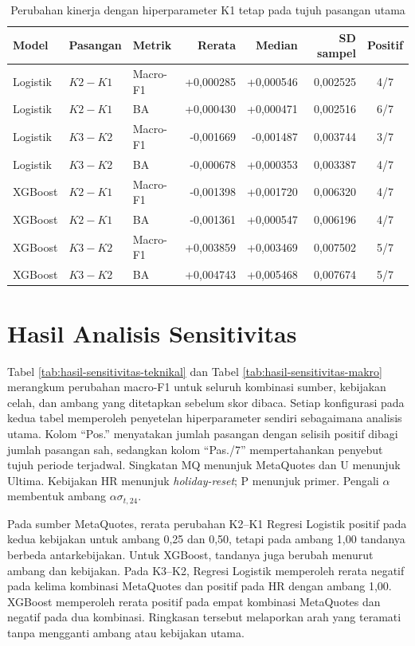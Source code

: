 \begin{table}[htbp]
\centering
\small
\setlength{\tabcolsep}{4pt}
\caption{Perubahan kinerja dengan hiperparameter K1 tetap pada tujuh pasangan utama}
\label{tab:hasil-parameter-tetap}
\begin{tabular}{lllrrrc}
\toprule
Model & Pasangan & Metrik & Rerata & Median & SD sampel & Positif \\
\midrule
Logistik & $K2-K1$ & Macro-F1 & +0,000285 & +0,000546 & 0,002525 & 4/7 \\
Logistik & $K2-K1$ & BA & +0,000430 & +0,000471 & 0,002516 & 6/7 \\
Logistik & $K3-K2$ & Macro-F1 & -0,001669 & -0,001487 & 0,003744 & 3/7 \\
Logistik & $K3-K2$ & BA & -0,000678 & +0,000353 & 0,003387 & 4/7 \\
XGBoost & $K2-K1$ & Macro-F1 & -0,001398 & +0,001720 & 0,006320 & 4/7 \\
XGBoost & $K2-K1$ & BA & -0,001361 & +0,000547 & 0,006196 & 4/7 \\
XGBoost & $K3-K2$ & Macro-F1 & +0,003859 & +0,003469 & 0,007502 & 5/7 \\
XGBoost & $K3-K2$ & BA & +0,004743 & +0,005468 & 0,007674 & 5/7 \\
\bottomrule
\end{tabular}
\end{table}


\section{Hasil Analisis Sensitivitas}

Tabel \ref{tab:hasil-sensitivitas-teknikal} dan Tabel \ref{tab:hasil-sensitivitas-makro} merangkum perubahan macro-F1 untuk seluruh kombinasi sumber, kebijakan celah, dan ambang yang ditetapkan sebelum skor dibaca. Setiap konfigurasi pada kedua tabel memperoleh penyetelan hiperparameter sendiri sebagaimana analisis utama. Kolom ``Pos.'' menyatakan jumlah pasangan dengan selisih positif dibagi jumlah pasangan sah, sedangkan kolom ``Pas./7'' mempertahankan penyebut tujuh periode terjadwal. Singkatan MQ menunjuk MetaQuotes dan U menunjuk Ultima. Kebijakan HR menunjuk \emph{holiday-reset}; P menunjuk primer. Pengali $\alpha$ membentuk ambang $\alpha\sigma_{t,24}$.

Pada sumber MetaQuotes, rerata perubahan K2--K1 Regresi Logistik positif pada kedua kebijakan untuk ambang 0,25 dan 0,50, tetapi pada ambang 1,00 tandanya berbeda antarkebijakan. Untuk XGBoost, tandanya juga berubah menurut ambang dan kebijakan. Pada K3--K2, Regresi Logistik memperoleh rerata negatif pada kelima kombinasi MetaQuotes dan positif pada HR dengan ambang 1,00. XGBoost memperoleh rerata positif pada empat kombinasi MetaQuotes dan negatif pada dua kombinasi. Ringkasan tersebut melaporkan arah yang teramati tanpa mengganti ambang atau kebijakan utama.


